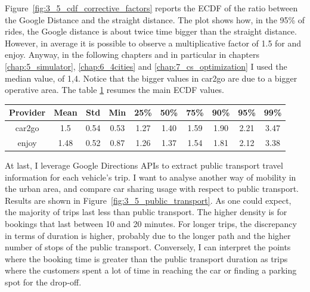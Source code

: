 Figure~\ref{fig:3_5_cdf_corrective_factors} reports the ECDF of the ratio between the Google Distance and the straight distance. The plot shows how, in the 95\% of rides, the Google distance is about twice time bigger than the straight distance. However, in average it is possible to observe a multiplicative factor of 1.5 for and enjoy. Anyway, in the following chapters and in particular in chapters \ref{chap:5_simulator}, \ref{chap:6_4cities} and \ref{chap:7_cs_optimization} I used the median value, of 1,4. Notice that the bigger values in car2go are due to a bigger operative area. The table \ref{tab:3_5_corrective_factor} resumes the main ECDF values.

\begin{table}[h!]
	\centering
	\begin{tabular}{|c|c|c|c|c|c|c|c|c|c|}
		
		\hline
		\textbf{Provider} & \textbf{Mean} & \textbf{Std} & \textbf{Min} & \textbf{25\%} & \textbf{50\%} & \textbf{75\%} & \textbf{90\%} & \textbf{95\%} & \textbf{99\%} \\ \hline
		car2go            & 1.5           & 0.54         & 0.53         & 1.27          & 1.40          & 1.59          & 1.90          & 2.21          & 3.47          \\ \hline
		enjoy             & 1.48          & 0.52         & 0.87         & 1.26          & 1.37          & 1.54          & 1.81          & 2.12          & 3.38          \\ \hline
	\end{tabular}
	\label{tab:3_5_corrective_factor}	
\end{table}


At last, I leverage Google Directions APIs to extract public transport travel information for each vehicle's trip. I want to analyse another way of mobility in the urban area, and compare car sharing usage with respect to public transport. Results are shown in Figure~\ref{fig:3_5_public_transport}.
As one could expect, the majority of trips last less than public transport. The higher density is for bookings that last between 10 and 20 minutes. For longer trips, the discrepancy in terms of duration is higher, probably due to the longer path and the higher number of stops of the public transport. Conversely, I can interpret the points where the booking time is greater than  the public transport duration as trips where the customers spent a lot of time in reaching the car or finding a parking spot for the drop-off.

